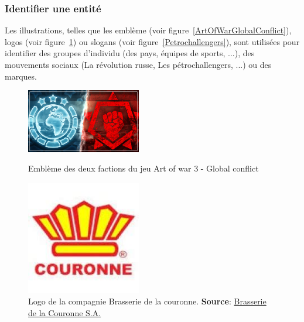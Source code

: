 \subsubsection{Identifier une entit\'e}
Les illustrations, telles que les embl\`eme (voir figure~\ref{ArtOfWarGlobalConflict}), logos (voir figure~\ref{BrasserieDeLaCouronne}) ou slogans (voir figure~\ref{Petrochallengers}), sont utilis\'ees pour identifier des groupes d'individu (des pays, \'equipes de sports, ...), des mouvements sociaux (La r\'evolution russe, Les p\'etrochallengers\cite{PetroChallenger, PetroChallenger1}, ...) ou des marques.




\begin{figure}[ht]
	\vspace{10pt}
	\centering
	\begin{minipage}{0.45\textwidth}
		\centering
		\includegraphics[width=5cm]{Pictures/ArtOfWar3.jpg}
		\caption{Embl\`eme des deux factions du jeu Art of war 3 - Global conflict }
		\label{ArtOfWarGlobalConflict}
	\end{minipage}
	\hspace{10pt}
	\begin{minipage}{0.45\textwidth}
		\centering
		\includegraphics[width=5cm]{Pictures/BrasserieDeCouronneLogo.jpeg}
		\caption{Logo de la compagnie Brasserie de la couronne. \textbf{Source}: \href{https://www.linkedin.com/company/bracour/?originalSubdomain=ht}{Brasserie de la Couronne S.A.} }
		\label{BrasserieDeLaCouronne}
	\end{minipage}

	\vspace{10pt}


\end{figure}
